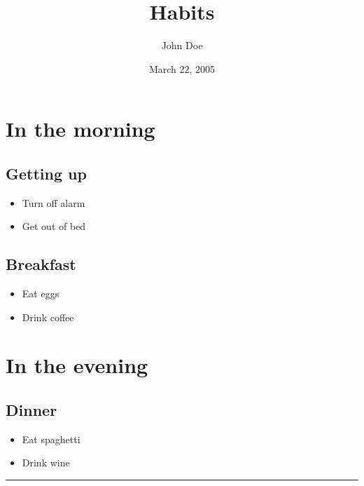 \documentclass[]{article}
\title{Habits}
\author{John Doe}
\date{March 22, 2005}
\begin{document}
\maketitle

\section{In the morning}\label{in-the-morning}

\subsection{Getting up}\label{getting-up}

\begin{itemize}
\itemsep1pt\parskip0pt
\item
  Turn off alarm
\item
  Get out of bed
\end{itemize}

\subsection{Breakfast}\label{breakfast}

\begin{itemize}
\itemsep1pt\parskip0pt
\item
  Eat eggs
\item
  Drink coffee
\end{itemize}

\section{In the evening}\label{in-the-evening}

\subsection{Dinner}\label{dinner}

\begin{itemize}
\itemsep1pt\parskip0pt
\item
  Eat spaghetti
\item
  Drink wine
\end{itemize}

\begin{center}\rule{3in}{0.4pt}\end{center}
\end{document}
